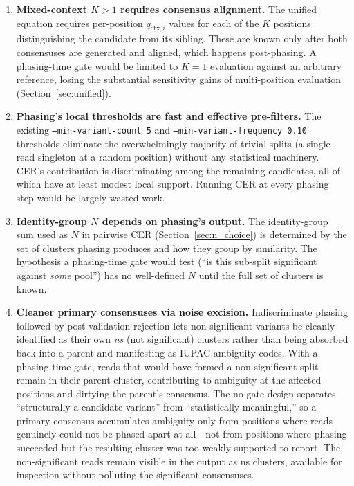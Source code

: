 \documentclass[11pt]{article}
\begin{document}
\begin{enumerate}
\item \textbf{Mixed-context $K > 1$ requires consensus alignment.} The
unified equation requires per-position $q_{\text{ctx},i}$ values for each of
the $K$ positions distinguishing the candidate from its sibling. These are
known only after both consensuses are generated and aligned, which happens
post-phasing. A phasing-time gate would be limited to $K = 1$ evaluation
against an arbitrary reference, losing the substantial sensitivity gains of
multi-position evaluation (Section~\ref{sec:unified}).

\item \textbf{Phasing's local thresholds are fast and effective pre-filters.}
The existing \texttt{--min-variant-count 5} and
\texttt{--min-variant-frequency 0.10} thresholds eliminate the
overwhelmingly majority of trivial splits (a single-read singleton at a
random position) without any statistical machinery. CER's contribution is
discriminating among the remaining candidates, all of which have at least
modest local support. Running CER at every phasing step would be largely
wasted work.

\item \textbf{Identity-group $N$ depends on phasing's output.} The
identity-group sum used as $N$ in pairwise CER (Section~\ref{sec:n_choice})
is determined by the set of clusters phasing produces and how they group by
similarity. The hypothesis a phasing-time gate would test (``is this
sub-split significant against \emph{some} pool'') has no well-defined $N$
until the full set of clusters is known.

\item \textbf{Cleaner primary consensuses via noise excision.} Indiscriminate
phasing followed by post-validation rejection lets non-significant variants
be cleanly identified as their own \emph{ns} (not significant) clusters
rather than being absorbed back into a parent and manifesting as IUPAC
ambiguity codes. With a phasing-time gate, reads that would have formed a
non-significant split remain in their parent cluster, contributing to
ambiguity at the affected positions and dirtying the parent's consensus. The
no-gate design separates ``structurally a candidate variant'' from
``statistically meaningful,'' so a primary consensus accumulates ambiguity
only from positions where reads genuinely could not be phased apart at
all---not from positions where phasing succeeded but the resulting cluster
was too weakly supported to report. The non-significant reads remain visible
in the output as ns clusters, available for inspection without polluting the
significant consensuses.
\end{enumerate}
\end{document}
